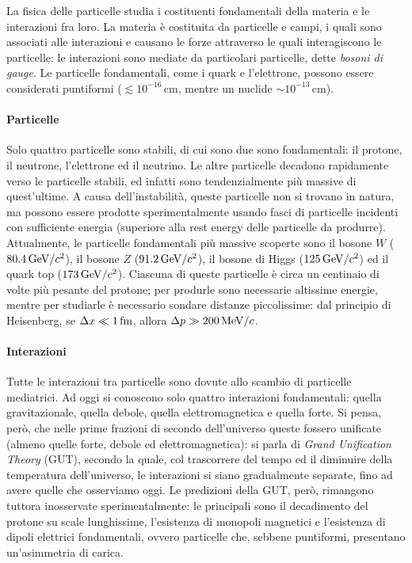 
La fisica delle particelle studia i costituenti fondamentali della materia e le interazioni fra loro. La materia è costituita da particelle e campi, i quali sono associati alle interazioni e causano le forze attraverso le quali interagiscono le particelle: le interazioni sono mediate da particolari particelle, dette \textit{bosoni di gauge}. Le particelle fondamentali, come i quark e l'elettrone, possono essere considerati puntiformi ($ \lesssim 10^{-16}\,\text{cm} $, mentre un nuclide $ \sim 10^{-13}\,\text{cm} $).

\paragraph{Particelle}

Solo quattro particelle sono stabili, di cui sono due sono fondamentali: il protone, il neutrone, l'elettrone ed il neutrino. Le altre particelle decadono rapidamente verso le particelle stabili, ed infatti sono tendenzialmente più massive di quest'ultime. A causa dell'instabilità, queste particelle non si trovano in natura, ma possono essere prodotte sperimentalmente usando fasci di particelle incidenti con sufficiente energia (superiore alla rest energy delle particelle da produrre).\\
Attualmente, le particelle fondamentali più massive scoperte sono il bosone $ W $ ($ 80.4\,\mathrm{GeV}/c^2 $), il bosone $ Z $ ($ 91.2\,\mathrm{GeV}/c^2 $), il bosone di Higgs ($ 125\,\mathrm{GeV}/c^2 $) ed il quark top ($ 173\,\mathrm{GeV}/c^2 $). Ciascuna di queste particelle è circa un centinaio di volte più pesante del protone; per produrle sono necessarie altissime energie, mentre per studiarle è necessario sondare distanze piccolissime: dal principio di Heisenberg, se $ \Delta x \ll 1\,\mathrm{fm} $, allora $ \Delta p \gg 200\,\mathrm{MeV}/c $.

\paragraph{Interazioni}

Tutte le interazioni tra particelle sono dovute allo scambio di particelle mediatrici. Ad oggi si conoscono solo quattro interazioni fondamentali: quella gravitazionale, quella debole, quella elettromagnetica e quella forte. Si pensa, però, che nelle prime frazioni di secondo dell'universo queste fossero unificate (almeno quelle forte, debole ed elettromagnetica): si parla di \textit{Grand Unification Theory} (GUT), secondo la quale, col trascorrere del tempo ed il diminuire della temperatura dell'universo, le interazioni si siano gradualmente separate, fino ad avere quelle che osserviamo oggi. Le predizioni della GUT, però, rimangono tuttora inosservate sperimentalmente: le principali sono il decadimento del protone su scale lunghissime, l'esistenza di monopoli magnetici e l'esistenza di dipoli elettrici fondamentali, ovvero particelle che, sebbene puntiformi, presentano un'asimmetria di carica.

